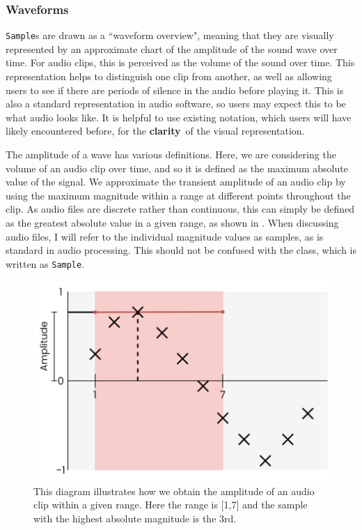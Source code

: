 \documentclass[12pt,a4paper,oneside,openright]{report}
\newcommand{\sample}{\texttt{Sample}}
\newcommand{\clarity}{\textbf{clarity}}
\begin{document}
\subsubsection{Waveforms}
\sample s are drawn as a ``waveform overview", meaning that they are visually represented by an approximate chart of the amplitude of the sound wave over time. For audio clips, this is perceived as the volume of the sound over time. This representation helps to distinguish one clip from another, as well as allowing users to see if there are periods of silence in the audio before playing it. This is also a standard representation in audio software, so users may expect this to be what audio looks like. It is helpful to use existing notation, which users will have likely encountered before, for the \clarity\ of the visual representation.

The amplitude of a wave has various definitions. Here, we are considering the volume of an audio clip over time, and so it is defined as the maximum absolute value of the signal. We approximate the transient amplitude of an audio clip by using the maximum magnitude within a range at different points throughout the clip. As audio files are discrete rather than continuous, this can simply be defined as the greatest absolute value in a given range, as shown in . When discussing audio files, I will refer to the individual magnitude values as samples, as is standard in audio processing. This should not be confused with the class, which is written as \sample.

\begin{figure}[h]
    \centering
    \includegraphics[scale=0.3]{images/amplitude_example.png}
    \caption{This diagram illustrates how we obtain the amplitude of an audio clip within a given range. Here the range is [1,7] and the sample with the highest absolute magnitude is the 3rd.}
    \label{fig:amplitude}
\end{figure}
\end{document}
